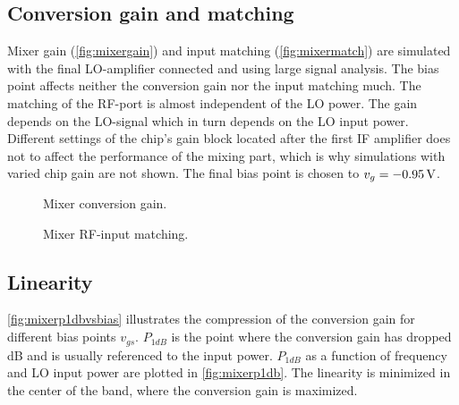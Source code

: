 		\subsection{Conversion gain and matching}
			Mixer gain (\autoref{fig:mixergain}) and input matching (\autoref{fig:mixermatch}) are simulated with the final LO-amplifier connected and using large signal analysis. The bias point affects neither the conversion gain nor the input matching much. The matching of the RF-port is almost independent of the LO power. The gain depends on the LO-signal which in turn depends on the LO input power. Different settings of the chip's gain block located after the first IF amplifier does not to affect the performance of the mixing part, which is why simulations with varied chip gain are not shown. The final bias point is chosen to $v_g=\unit[-0.95]{V}$.

			\begin{figure}[hbt!]
				\centering
				\caption[Mixer conversion gain.]{Mixer conversion gain.}\label{fig:mixergain}
			\end{figure}

			\begin{figure}[hbt!]
				\centering
				\caption[Mixer RF-input matching.]{Mixer RF-input matching.}\label{fig:mixermatch}
			\end{figure}

		\subsection{Linearity}
			\autoref{fig:mixerp1dbvsbias} illustrates the compression of the conversion gain for different bias points $v_{gs}$. $P_{1dB}$ is the point where the conversion gain has dropped \unit[1]{dB} and is usually referenced to the input power. $P_{1dB}$ as a function of frequency and LO input power are plotted in \autoref{fig:mixerp1db}. The linearity is minimized in the center of the band, where the conversion gain is maximized.

